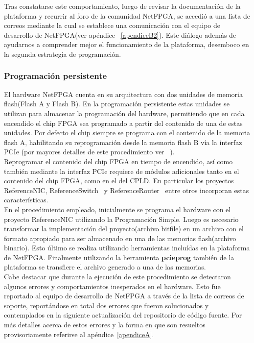 Tras constatarse este comportamiento, luego de revisar la documentaci\'on de la plataforma y recurrir al foro de la comunidad NetFPGA, se accedió a una lista de correos mediante la cual se establece una comunicaci\'on con el equipo de desarrollo de NetFPGA(ver ap\'endice ~\ref{apendiceB2}). Este di\'alogo adem\'as de ayudarnos a comprender mejor el funcionamiento de la plataforma, desemboco en la segunda estrategia de programaci\'on.

\subsubsection{Programaci\'on persistente}
El hardware NetFPGA cuenta en su arquitectura con dos unidades de memoria flash(Flash A y Flash B). En la programaci\'on persistente estas unidades se utilizan para almacenar la programaci\'on del hardware, permitiendo que en cada encendido el chip FPGA sea programado a partir del contenido de una de estas unidades. Por defecto el chip siempre se programa con el contenido de la memoria flash A, habilitando su reprogramaci\'on desde la memoria flash B v\'ia la interfaz PCIe (por mayores detalles de este procedimiento ver ~\citep{PCIEProgProject}).\\

Reprogramar el contenido del chip FPGA en tiempo de encendido, así como también mediante la interfaz PCIe requiere de módulos adicionales tanto en el contenido del chip FPGA, como en el del CPLD. En particular los proyectos ReferenceNIC\citep{ReferenceNICProject}, ReferenceSwitch~\citep{ReferenceSwitchProject} y ReferenceRouter~\citep{ReferenceRouterProject} entre otros incorporan estas características.\\

En el procedimiento empleado, inicialmente se programa el hardware con el proyecto ReferenceNIC utilizando la Programaci\'on Simple. Luego es necesario transformar la implementaci\'on del proyecto(archivo bitfile) en un archivo con el formato apropiado para ser almacenado en una de las memorias flash(archivo binario). Esto \'ultimo se realiza utilizando herramientas inclu\'idas en la plataforma de NetFPGA. Finalmente utilizando la herramienta \textbf{pcieprog} también de la plataforma se transfiere el archivo generado a una de las memorias.\\

Cabe destacar que durante la ejecuci\'on de este procedimiento se detectaron algunos errores y comportamientos inesperados en el hardware. Esto fue reportado al equipo de desarrollo de NetFPGA a través de la lista de correos de soporte, reportándose en total dos errores que fueron solucionados y contemplados en la siguiente actualizaci\'on del repositorio de c\'odigo fuente. Por m\'as detalles acerca de estos errores y la forma en que son resueltos provisoriamente referirse al ap\'endice~\ref{apendiceA}.\\

